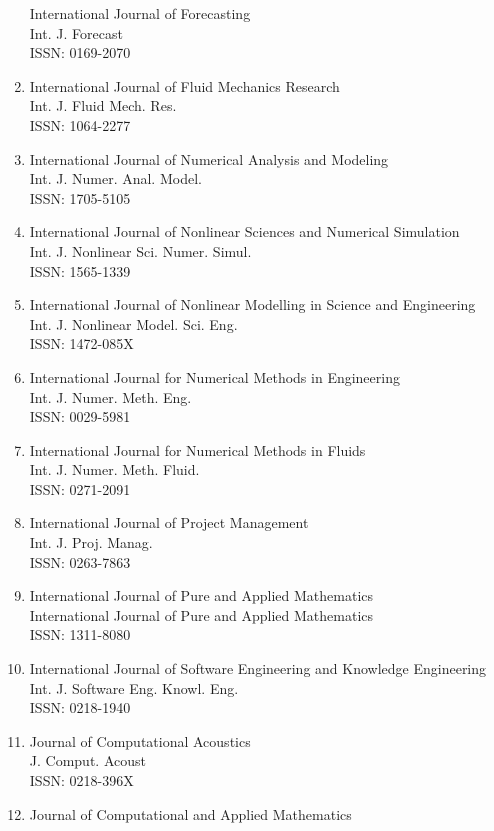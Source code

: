 \begin{enumerate}
 International Journal of Forecasting\\
 Int. J. Forecast\\
 ISSN: 0169-2070
\item
 International Journal of Fluid Mechanics Research\\
 Int. J. Fluid Mech. Res.\\
 ISSN: 1064-2277
\item
 International Journal of Numerical Analysis and Modeling\\
 Int. J. Numer. Anal. Model.\\
 ISSN: 1705-5105
\item
 International Journal of Nonlinear Sciences and Numerical Simulation\\
 Int. J. Nonlinear Sci. Numer. Simul.\\
 ISSN: 1565-1339
\item
 International Journal of Nonlinear Modelling in Science and Engineering\\
 Int. J. Nonlinear Model. Sci. Eng.\\
 ISSN: 1472-085X
\item
 International Journal for Numerical Methods in Engineering\\
 Int. J. Numer. Meth. Eng.\\
 ISSN: 0029-5981
\item
 International Journal for Numerical Methods in Fluids\\
 Int. J. Numer. Meth. Fluid.\\
 ISSN: 0271-2091
\item
 International Journal of Project Management\\
 Int. J. Proj. Manag.\\
 ISSN: 0263-7863
\item
 International Journal of Pure and Applied Mathematics\\
 International Journal of Pure and Applied Mathematics\\
 ISSN: 1311-8080
\item
 International Journal of Software Engineering and Knowledge Engineering\\
 Int. J. Software Eng. Knowl. Eng.\\
 ISSN: 0218-1940
\item
 Journal of Computational Acoustics\\
 J. Comput. Acoust\\
 ISSN: 0218-396X
\item
 Journal of Computational and Applied Mathematics\\

\end{enumerate}
